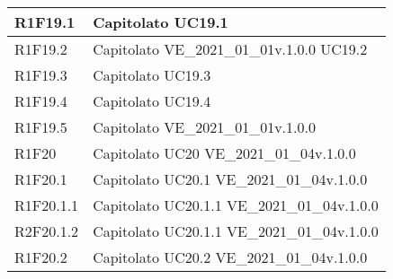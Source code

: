 \begin{center}
\begin{longtable}{|p{22mm}|p{44mm}|}
R1F19.1 &
Capitolato \newline
UC19.1 \newline
\\
\hline

R1F19.2 &
Capitolato \newline
VE\_2021\_01\_01v.1.0.0 \newline
UC19.2 \newline
\\
\hline

R1F19.3 &
Capitolato \newline
UC19.3 \newline
\\
\hline

R1F19.4 &
Capitolato \newline
UC19.4 \newline
\\
\hline

R1F19.5 &
Capitolato \newline
VE\_2021\_01\_01v.1.0.0 \newline
\\
\hline

R1F20 &
Capitolato \newline
UC20 \newline
VE\_2021\_01\_04v.1.0.0 \newline
\\
\hline

R1F20.1 &
Capitolato \newline
UC20.1 \newline
VE\_2021\_01\_04v.1.0.0 \newline
\\
\hline

R1F20.1.1 &
Capitolato \newline
UC20.1.1 \newline
VE\_2021\_01\_04v.1.0.0 \newline
\\
\hline

R2F20.1.2 &
Capitolato \newline
UC20.1.1 \newline
VE\_2021\_01\_04v.1.0.0 \newline
\\
\hline

R1F20.2 &
Capitolato \newline
UC20.2 \newline
VE\_2021\_01\_04v.1.0.0 \newline
\\
\hline


\end{longtable}
\end{center}
